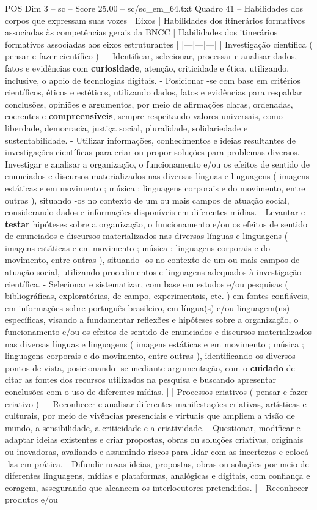 \begin{textsample}{POS Dim 3 – sc – Score 25.00 – sc/sc\_em\_64.txt}
Quadro 41 – Habilidades dos corpos que expressam suas vozes | Eixos | Habilidades dos itinerários formativos associadas às competências gerais da BNCC | Habilidades dos itinerários formativos associadas aos eixos estruturantes | |---|---|---| | Investigação científica ( pensar e fazer científico ) | - Identificar, selecionar, processar e analisar dados, fatos e evidências com \textbf{curiosidade}, atenção, criticidade e ética, utilizando, inclusive, o apoio de tecnologias digitais. - Posicionar -se com base em critérios científicos, éticos e estéticos, utilizando dados, fatos e evidências para respaldar conclusões, opiniões e argumentos, por meio de afirmações claras, ordenadas, coerentes e \textbf{compreensíveis}, sempre respeitando valores universais, como liberdade, democracia, justiça social, pluralidade, solidariedade e sustentabilidade. - Utilizar informações, conhecimentos e ideias resultantes de investigações científicas para criar ou propor soluções para problemas diversos. | - Investigar e analisar a organização, o funcionamento e/ou os efeitos de sentido de enunciados e discursos materializados nas diversas línguas e linguagens ( imagens estáticas e em movimento ; música ; linguagens corporais e do movimento, entre outras ), situando -os no contexto de um ou mais campos de atuação social, considerando dados e informações disponíveis em diferentes mídias. - Levantar e \textbf{testar} hipóteses sobre a organização, o funcionamento e/ou os efeitos de sentido de enunciados e discursos materializados nas diversas línguas e linguagens ( imagens estáticas e em movimento ; música ; linguagens corporais e do movimento, entre outras ), situando -os no contexto de um ou mais campos de atuação social, utilizando procedimentos e linguagens adequados à investigação científica. - Selecionar e sistematizar, com base em estudos e/ou pesquisas ( bibliográficas, exploratórias, de campo, experimentais, etc. ) em fontes confiáveis, em informações sobre português brasileiro, em língua(s) e/ou linguagem(ns) específicas, visando a fundamentar reflexões e hipóteses sobre a organização, o funcionamento e/ou os efeitos de sentido de enunciados e discursos materializados nas diversas línguas e linguagens ( imagens estáticas e em movimento ; música ; linguagens corporais e do movimento, entre outras ), identificando os diversos pontos de vista, posicionando -se mediante argumentação, com o \textbf{cuidado} de citar as fontes dos recursos utilizados na pesquisa e buscando apresentar conclusões com o uso de diferentes mídias. | | Processos criativos ( pensar e fazer criativo ) | - Reconhecer e analisar diferentes manifestações criativas, artísticas e culturais, por meio de vivências presenciais e virtuais que ampliem a visão de mundo, a sensibilidade, a criticidade e a criatividade. - Questionar, modificar e adaptar ideias existentes e criar propostas, obras ou soluções criativas, originais ou inovadoras, avaliando e assumindo riscos para lidar com as incertezas e colocá -las em prática. - Difundir novas ideias, propostas, obras ou soluções por meio de diferentes linguagens, mídias e plataformas, analógicas e digitais, com confiança e coragem, assegurando que alcancem os interlocutores pretendidos. | - Reconhecer produtos e/ou 
\end{textsample}
